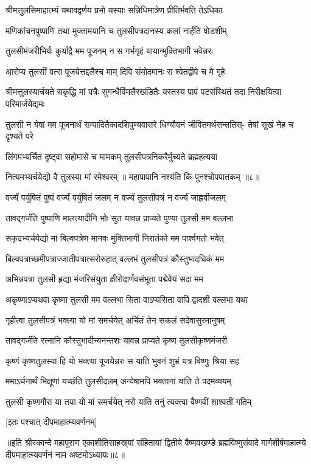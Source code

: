 

\twolineshloka
{श्रीमत्तुलसिमाहात्म्यं यथावद्वर्णय प्रभो}
{यस्याः सन्निधिमात्रेण प्रीतिर्भवति तेऽधिका} %


\twolineshloka
{मणिकांचनपुष्पाणि तथा मुक्तामयानि च}
{तुलसीपत्रदानस्य कलां नार्हंति षोडशीम्} %

\twolineshloka
{तुलसीमंजरीभिर्यः कुर्याद्वै मम पूजनम्}
{न स गर्भगृहं यायान्मुक्तिभागी भवेन्नरः} %

\twolineshloka
{आरोप्य तुलसीं वत्स पूजयेत्तद्दलैश्च माम्}
{दिवि संमोदमानः स श्वेतद्वीपे च मे गृहे} %

\fourlineindentedshloka
{श्रीमत्तुलस्यार्चयते सकृद्धि मां}
{पत्रैः सुगन्धैर्विमलैरखंडितैः}
{यस्तस्य पापं पटसंस्थितं तदा}
{निरीक्षयित्वा परिमार्जयेद्यमः} %

\fourlineindentedshloka
{तुलसी न येषां मम पूजनार्थं}
{सम्पादितैकादशिपुण्यवासरे}
{धिग्यौवनं जीवितमर्थसन्ततिस्-}
{तेषां सुखं नेह च दृश्यते परे} %

\twolineshloka
{लिंगमभ्यर्चितं दृष्ट्वा सहोमासे च मामकम्}
{तुलसीपत्रनिकरैर्मुच्यते ब्रह्महत्यया} %

नित्यमभ्यर्चयेद्यो वै तुलस्या मां रमेश्वरम् ॥
महापापानि नश्यंति किं पुनश्चोपपातकम् ॥८॥

\twolineshloka
{वर्ज्यं पर्युषितं पुष्पं वर्ज्यं पर्युषितं जलम्}
{न वर्ज्यं तुलसीपत्रं न वर्ज्यं जाह्नवीजलम्} %

\twolineshloka
{तावद्गर्जंति पुष्पाणि मालत्यादीनि भोः सुत}
{यावन्न प्राप्यते पुण्या तुलसी मम वल्लभा} %

\twolineshloka
{सकृदभ्यर्चयेद्यो मां बिल्वपत्रेण मानवः}
{मुक्तिभागी निरातंको मम पार्श्वगतो भवेत्} %

\twolineshloka
{बिल्वपत्राच्छमीपत्राज्जातीपत्रात्सरोरुहात्}
{वल्लभं तुलसीपत्रं कौस्तुभादधिकं मम} %

\twolineshloka
{अभिन्नपत्रा तुलसी हृद्या मंजरिसंयुता}
{क्षीरोदार्णवसंभूता पद्मेवेयं सदा मम} %

\twolineshloka
{अकृष्णाऽप्यथवा कृष्णा तुलसी मम वल्लभा}
{सिता वाऽप्यसिता वापि द्वादशी वल्लभा यथा} %

\twolineshloka
{गृहीत्वा तुलसीपत्रं भक्त्या यो मां समर्चयेत्}
{अर्चितं तेन सकलं सदेवासुरमानुषम्} %

\twolineshloka
{तावद्गर्जंति रत्नानि कौस्तुभादीन्यनन्तशः}
{यावन्न प्राप्यते कृष्ण तुलसीकृष्णमंजरी} %

\twolineshloka
{कृष्णं कृष्णतुलस्या हि यो भक्त्या पूजयेन्नरः}
{स याति भुवनं शुभ्रं यत्र विष्णुः श्रिया सह} %

\twolineshloka
{ममाऽर्चनार्थं भिक्षूणां यच्छंति तुलसीदलम्}
{अन्येषामपि भक्तानां यांति ते पदमव्ययम्} %

\twolineshloka
{तुलसी कृष्णगौरा या तया यो मां समर्चयेत्}
{नरो याति तनुं त्यक्त्वा वैष्णवीं शाश्वतीं गतिम्} %

[इतः पश्चात् दीपमाहात्म्यवर्णनम्]

॥इति श्रीस्कान्दे महापुराण एकाशीतिसाहस्र्यां संहितायां द्वितीये वैष्णवखण्डे ब्रह्मविष्णुसंवादे मार्गशीर्षमाहात्म्ये दीपमाहात्म्यवर्णनं नाम अष्टमोऽध्यायः॥८॥

